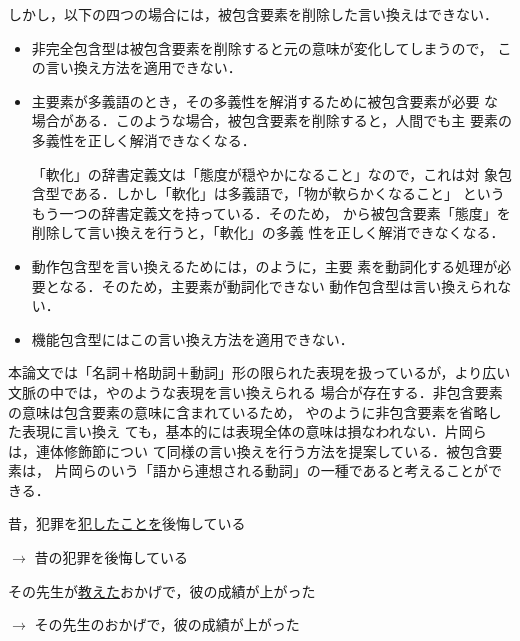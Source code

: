\documentclass{nlp}
\begin{document}
しかし，以下の四つの場合には，被包含要素を削除した言い換えはできない．
\begin{itemize}
 \item 非完全包含型は被包含要素を削除すると元の意味が変化してしまうので，
       この言い換え方法を適用できない．
       
 \item 主要素が多義語のとき，その多義性を解消するために被包含要素が必要
       な場合がある．このような場合，被包含要素を削除すると，人間でも主
       要素の多義性を正しく解消できなくなる．
       「軟化」の辞書定義文は「態度が穏やかになること」なので，これは対
       象包含型である．しかし「軟化」は多義語で，「物が軟らかくなること」
       というもう一つの辞書定義文を持っている．そのため，
       から被包含要素「態度」を削除して言い換えを行うと，「軟化」の多義
       性を正しく解消できなくなる．
       
 \item 動作包含型を言い換えるためには，のように，主要
       素を動詞化する処理が必要となる．そのため，主要素が動詞化できない
       動作包含型は言い換えられない．
       
 \item 機能包含型にはこの言い換え方法を適用できない．
\end{itemize}

本論文では「名詞＋格助詞＋動詞」形の限られた表現を扱っているが，より広い
文脈の中では，やのような表現を言い換えられる
場合が存在する．非包含要素の意味は包含要素の意味に含まれているため，
やのように非包含要素を省略した表現に言い換え
ても，基本的には表現全体の意味は損なわれない．片岡らは，連体修飾節につい
て同様の言い換えを行う方法を提案している\cite{katayama00}．被包含要素は，
片岡らのいう「語から連想される動詞」の一種であると考えることができる．
\begin{example}
 \item 昔，犯罪を\underline{犯したことを}後悔している

 $\rightarrow$ 昔の犯罪を後悔している 
 
 \item その先生が\underline{教えた}おかげで，彼の成績が上がった
 
 $\rightarrow$ その先生のおかげで，彼の成績が上がった 
\end{example}
\end{document}
